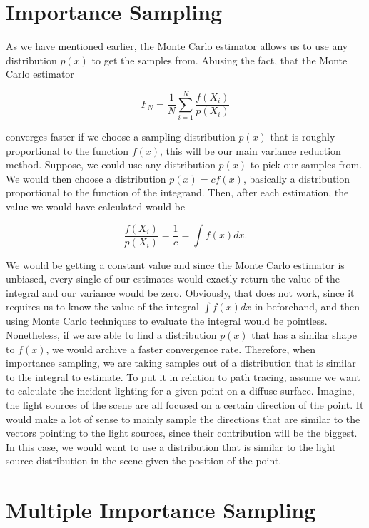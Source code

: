 \section{Importance Sampling}
\label{ch:preliminaries:is}

As we have mentioned earlier, the Monte Carlo estimator allows us to use any distribution $p(x)$ to get the samples from. Abusing the fact, that the Monte Carlo estimator 

\begin{equation}
F_N = \frac{1}{N}\sum_{i = 1}^{N}\frac{f(X_i)}{p(X_i)}
\end{equation}

converges faster if we choose a sampling distribution $p(x)$ that is roughly proportional to the function $f(x)$, this will be our main variance reduction method. Suppose, we could use any distribution $p(x)$ to pick our samples from. We would then choose a distribution $p(x) = cf(x)$, basically a distribution proportional to the function of the integrand. Then, after each estimation, the value we would have calculated would be 

\begin{equation}
\frac{f(X_i)}{p(X_i)} = \frac{1}{c} = \int{f(x)dx}.
\end{equation}

We would be getting a constant value and since the Monte Carlo estimator is unbiased, every single of our estimates would exactly return the value of the integral and our variance would be zero. Obviously, that does not work, since it requires us to know the value of the integral $\int{f(x)dx}$ in beforehand, and then using Monte Carlo techniques to evaluate the integral would be pointless. Nonetheless, if we are able to find a distribution $p(x)$ that has a similar shape to $f(x)$, we would archive a faster convergence rate. Therefore, when importance sampling, we are taking samples out of a distribution that is similar to the integral to estimate. To put it in relation to path tracing, assume we want to calculate the incident lighting for a given point on a diffuse surface. Imagine, the light sources of the scene are all focused on a certain direction of the point. It would make a lot of sense to mainly sample the directions that are similar to the vectors pointing to the light sources, since their contribution will be the biggest. In this case, we would want to use a distribution that is similar to the light source distribution in the scene given the position of the point.

\section{Multiple Importance Sampling}
\label{ch:preliminaries:mis}

